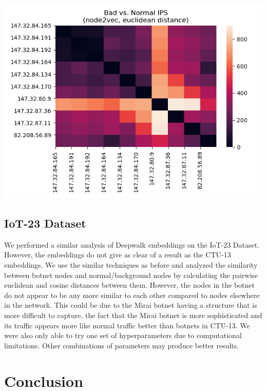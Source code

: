 \documentclass[10pt]{article}
\begin{document}
\begin{multicols}{2}
\includegraphics[scale=.5]{2b}


\subsection{IoT-23 Dataset}

We performed a similar analysis of Deepwalk embeddings on the IoT-23 Dataset. However, the embeddings do not give as clear of a result as the CTU-13 embeddings. We use the similar techniques as before and analyzed the similarity between botnet nodes and normal/background nodes by calculating the pairwise euclidean and cosine distances between them. However, the nodes in the botnet do not appear to be any more similar to each other compared to nodes elsewhere in the network. This could be due to the Mirai botnet having a structure that is more difficult to capture, the fact that the Mirai botnet is more sophisticated and its traffic appears more like normal traffic better than botnets in CTU-13. We were also only able to try one set of hyperparameters due to computational limitations. Other combinations of parameters may produce better results. 

\section{Conclusion}


\end{multicols}
\end{document}
